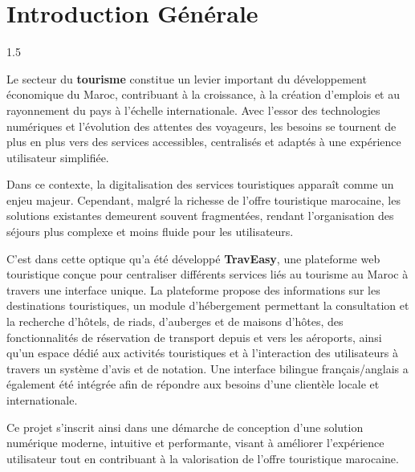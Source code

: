 \documentclass[a4paper,12pt]{report}
\begin{document}
\newpage
{}
\setcounter{page}{1}
\chapter*{Introduction Générale}
\vspace{0.5cm}
\begin{spacing}{1.5}
\justifying

Le secteur du \textbf{tourisme} constitue un levier important du développement économique du Maroc, contribuant à la croissance, à la création d'emplois et au rayonnement du pays à l'échelle internationale. Avec l'essor des technologies numériques et l'évolution des attentes des voyageurs, les besoins se tournent de plus en plus vers des services accessibles, centralisés et adaptés à une expérience utilisateur simplifiée.
\vspace{0.5cm}


Dans ce contexte, la digitalisation des services touristiques apparaît comme un enjeu majeur. Cependant, malgré la richesse de l'offre touristique marocaine, les solutions existantes demeurent souvent fragmentées, rendant l'organisation des séjours plus complexe et moins fluide pour les utilisateurs.
\vspace{0.5cm}

C'est dans cette optique qu'a été développé \textbf{TravEasy}, une plateforme web touristique conçue pour centraliser différents services liés au tourisme au Maroc à travers une interface unique. La plateforme propose des informations sur les destinations touristiques, un module d'hébergement permettant la consultation et la recherche d'hôtels, de riads, d'auberges et de maisons d'hôtes, des fonctionnalités de réservation de transport depuis et vers les aéroports, ainsi qu'un espace dédié aux activités touristiques et à l'interaction des utilisateurs à travers un système d'avis et de notation. Une interface bilingue français/anglais a également été intégrée afin de répondre aux besoins d'une clientèle locale et internationale.
\vspace{0.5cm} 

Ce projet s'inscrit ainsi dans une démarche de conception d'une solution numérique moderne, intuitive et performante, visant à améliorer l'expérience utilisateur tout en contribuant à la valorisation de l'offre touristique marocaine.
\vspace{0.5cm}


\end{spacing}
\end{document}
